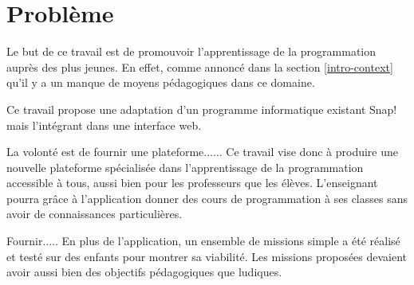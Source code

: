 \section{Problème}
\label{into-problem}
Le but de ce travail est de promouvoir l'apprentissage de la programmation auprès des plus jeunes. En effet, comme annoncé dans la section \ref{intro-context} qu'il y a un manque de moyens pédagogiques dans ce domaine. 

Ce travail propose une adaptation d'un programme informatique existant Snap! mais l'intégrant dans une interface web. 

La volonté est de fournir une plateforme......
Ce travail vise donc à produire une nouvelle plateforme spécialisée dans l'apprentissage de la programmation accessible à tous, aussi bien pour les professeurs que les élèves. L'enseignant pourra grâce à l'application donner des cours de programmation à ses classes sans avoir de connaissances particulières.

Fournir.....
En plus de l'application, un ensemble de missions simple a été réalisé et testé sur des enfants pour montrer sa viabilité. Les missions proposées devaient avoir aussi bien des objectifs pédagogiques que ludiques.
